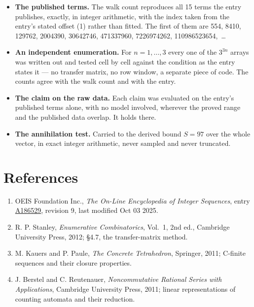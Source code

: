 \documentclass[11pt]{article}
\theoremstyle{definition}
\begin{document}
\begin{itemize}

\item {\bfseries The published terms.} The walk count reproduces all 15 terms the entry publishes, exactly, in integer arithmetic, with the index taken from the entry's stated offset (1) rather than fitted. The first of them are 554, 8410, 129762, 2004390, 30642746, 471337960, 7226974262, 110986523654,~\dots

\item {\bfseries An independent enumeration.} For $n = 1,\dots,3$ every one of the $3^{3n}$ arrays was written out and tested cell by cell against the condition as the entry states it --- no transfer matrix, no row window, a separate piece of code. The counts agree with the walk count and with the entry.

\item {\bfseries The claim on the raw data.} Each claim was evaluated on the entry's published terms alone, with no model involved, wherever the proved range and the published data overlap. It holds there.

\item {\bfseries The annihilation test.} Carried to the derived bound $S = 97$ over the whole vector, in exact integer arithmetic, never sampled and never truncated.

\end{itemize}

\section{References}

\begin{enumerate}

\item OEIS Foundation Inc., \emph{The On-Line Encyclopedia of Integer Sequences}, entry \href{https://oeis.org/A186529}{A186529}, revision 9, last modified Oct 03 2025.

\item R. P. Stanley, \emph{Enumerative Combinatorics}, Vol.~1, 2nd ed., Cambridge University Press, 2012; \S4.7, the transfer-matrix method.

\item M. Kauers and P. Paule, \emph{The Concrete Tetrahedron}, Springer, 2011; C-finite sequences and their closure properties.

\item J. Berstel and C. Reutenauer, \emph{Noncommutative Rational Series with Applications}, Cambridge University Press, 2011; linear representations of counting automata and their reduction.

\end{enumerate}
\end{document}
